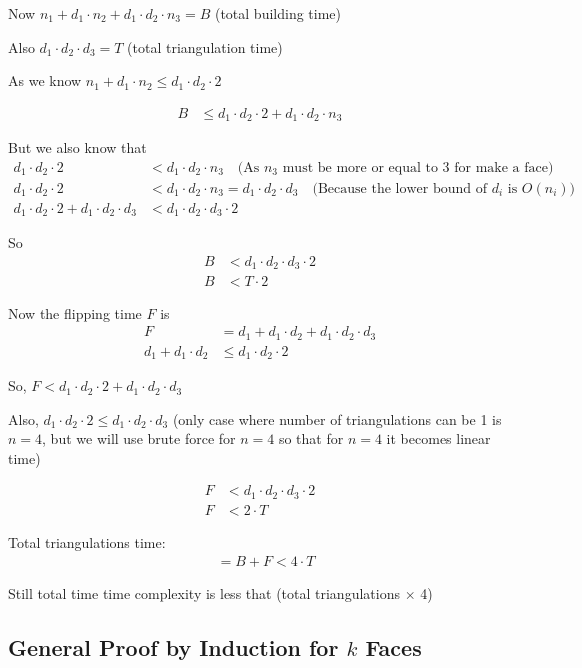 \documentclass[12pt,a4paper]{article}
\begin{document}
Now $n_1 + d_1 \cdot n_2 + d_1 \cdot d_2 \cdot n_3 = B$ (total building time)

Also $d_1 \cdot d_2 \cdot d_3 = T$ (total triangulation time)

As we know $n_1 + d_1 \cdot n_2 \leq d_1 \cdot d_2 \cdot 2$

\begin{align*}
B &\leq d_1 \cdot d_2 \cdot 2 + d_1 \cdot d_2 \cdot n_3
\end{align*}

But we also know that 
\begin{align*}
d_1 \cdot d_2 \cdot 2 &< d_1 \cdot d_2 \cdot n_3 \quad \text{(As $n_3$ must be more or equal to 3 for make a face)} \\
d_1 \cdot d_2 \cdot 2 &< d_1 \cdot d_2 \cdot n_3 = d_1 \cdot d_2 \cdot d_3 \quad \text{(Because the lower bound of $d_i$ is $O(n_i)$)} \\
d_1 \cdot d_2 \cdot 2 + d_1 \cdot d_2 \cdot d_3 &< d_1 \cdot d_2 \cdot d_3 \cdot 2
\end{align*}

So 
\begin{align*}
B &< d_1 \cdot d_2 \cdot d_3 \cdot 2 \\
B &< T \cdot 2
\end{align*}

Now the flipping time $F$ is 
\begin{align*}
F &= d_1 + d_1 \cdot d_2 + d_1 \cdot d_2 \cdot d_3 \\
d_1 + d_1 \cdot d_2 &\leq d_1 \cdot d_2 \cdot 2
\end{align*}

So, $F < d_1 \cdot d_2 \cdot 2 + d_1 \cdot d_2 \cdot d_3$

Also, $d_1 \cdot d_2 \cdot 2 \leq d_1 \cdot d_2 \cdot d_3$ (only case where number of triangulations can be 1 is $n=4$, but we will use brute force for $n = 4$ so that for $n = 4$ it becomes linear time)

\begin{align*}
F &< d_1 \cdot d_2 \cdot d_3 \cdot 2 \\
F &< 2 \cdot T
\end{align*}

Total triangulations time:
\begin{align*}
&= B + F < 4 \cdot T
\end{align*}

Still total time time complexity is less that (total triangulations $\times$ 4)

\subsection{General Proof by Induction for $k$ Faces}
\end{document}
